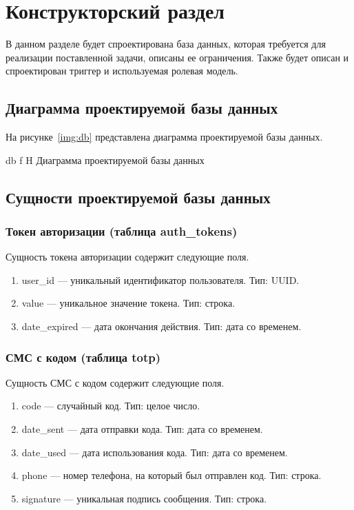 \chapter{Конструкторский раздел}

В данном разделе будет спроектирована база данных, которая требуется для реализации поставленной задачи, описаны ее ограничения. Также будет описан и спроектирован триггер и используемая ролевая модель.

\section{Диаграмма проектируемой базы данных}

На рисунке~\ref{img:db} представлена диаграмма проектируемой базы данных.

{db}
{f}
{H}
{\textwidth}
{Диаграмма проектируемой базы данных}

\pagebreak
\section{Сущности проектируемой базы данных}

\subsection{Токен авторизации (таблица auth\_tokens)}

Сущность токена авторизации содержит следующие поля.

\begin{enumerate}
	\item user\_id --- уникальный идентификатор пользователя. Тип: UUID.
	\item value --- уникальное значение токена. Тип: строка.
	\item date\_expired --- дата окончания действия. Тип: дата со временем.
\end{enumerate}

\subsection{СМС с кодом (таблица totp)}

Сущность СМС с кодом содержит следующие поля.

\begin{enumerate}
	\item code --- случайный код. Тип: целое число.
	\item date\_sent --- дата отправки кода. Тип: дата со временем.
	\item date\_used --- дата использования кода. Тип: дата со временем.
	\item phone --- номер телефона, на который был отправлен код. Тип: строка.
	\item signature --- уникальная подпись сообщения. Тип: строка.
\end{enumerate}

